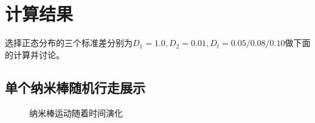 \documentclass[UTF8]{ctexart}
\begin{document}
	\section{计算结果}
	\begin{flushleft}
		选择正态分布的三个标准差分别为$D_1=1.0,D_2=0.01,D_t=0.05/0.08/0.10$做下面的计算并讨论。
	\end{flushleft}
	
	\subsection{单个纳米棒随机行走展示}
	
			\begin{figure}[H]
					\centering  %
					\caption{纳米棒运动随着时间演化}
				\end{figure}
			
\end{document}
